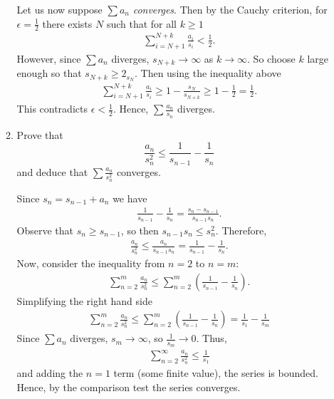 \documentclass [10pt]{article}
\newcommand{\jg}[1]{{\color{blue} #1}}
\begin{document}
\begin{enumerate}
\begin{enumerate}
{Let us now suppose $\sum a_n$ \emph{converges}. Then by the Cauchy criterion, for $\epsilon = \frac{1}{2}$ there exists $N$ such that for all $k \geq 1$
\begin{align*}
    \sum_{i=N+1}^{N+k} \frac{a_i}{s_i} < \frac{1}{2}. 
\end{align*}
However, since $\sum a_n$ diverges, $s_{N+k} \rightarrow \infty$ as $k \rightarrow \infty$. So choose $k$ large enough so that $s_{N+k} \geq 2_{s_N}$. Then using the inequality above
\begin{align*}
    \sum_{i=N+1}^{N+k} \frac{a_i}{s_i} \geq 1 - \frac{s_N}{s_{N+k}} \geq 1 - \frac{1}{2} = \frac{1}{2}. 
\end{align*}
This contradicts $\epsilon < \frac{1}{2}$. Hence, $\sum \frac{a_n}{s_n}$ diverges.
}

\item Prove that
$$
\frac{a_n}{s_n^2} \leq \frac{1}{s_{n-1}}-\frac{1}{s_n}
$$
and deduce that $\sum \frac{a_n}{s_n^2}$ converges.

\jg{
Since $s_n = s_{n-1} + a_n$ we have 
\begin{align*}
    \frac{1}{s_{n-1}} - \frac{1}{s_n} = \frac{s_n - s_{n-1}}{s_{n-1}s_n}. 
\end{align*}
Observe that $s_n \geq s_{n-1}$, so then $s_{n-1} s_n \leq s_n^2$. Therefore, 
\begin{align*}
    \frac{a_n}{s_n^2} \leq \frac{a_n}{s_{n-1} s_n} = \frac{1}{s_{n-1}} - \frac{1}{s_n}. 
\end{align*}
Now, consider the inequality from $n=2$ to $n=m$: 
\begin{align*}
    \sum_{n=2}^m \frac{a_n}{s_n^2} \leq \sum_{n=2}^m  \left( \frac{1}{s_{n-1}} - \frac{1}{s_n} \right).
\end{align*}
Simplifying the right hand side
\begin{align*}
    \sum_{n=2}^m \frac{a_n}{s_n^2} \leq  \sum_{n=2}^m  \left( \frac{1}{s_{n-1}} - \frac{1}{s_n} \right) = \frac{1}{s_1} - \frac{1}{s_m}
\end{align*}
Since $\sum a_n$ diverges, $s_m \rightarrow \infty$, so $\frac{1}{s_m} \rightarrow 0$. Thus, 
\begin{align*}
    \sum_{n=2}^\infty \frac{a_n}{s_n^2} \leq \frac{1}{s_1}
\end{align*}
and adding the $n=1$ term (some finite value), the series is bounded. Hence, by the comparison test the series converges. 
}



\end{enumerate}



\end{enumerate}
\end{document}
